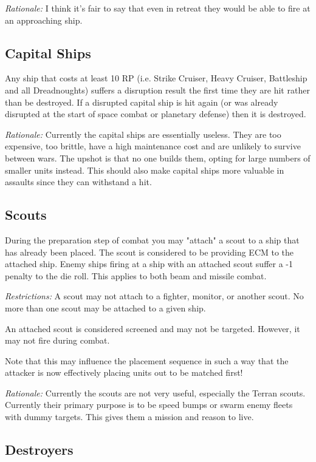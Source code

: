 \textit{Rationale:} I think it's fair to say that even in retreat they would be able to fire at an approaching ship.

\subsection{Capital Ships}

Any ship that costs at least 10 RP (i.e. Strike Cruiser, Heavy Cruiser, Battleship and all Dreadnoughts) suffers a disruption result the first time they are hit rather than be destroyed. If a disrupted capital ship is hit again (or was already disrupted at the start of space combat or planetary defense) then it is destroyed.

\textit{Rationale:} Currently the capital ships are essentially useless. They are too expensive, too brittle, have a high maintenance cost and are unlikely to survive between wars. The upshot is that no one builds them, opting for large numbers of smaller units instead. This should also make capital ships more valuable in assaults since they can withstand a hit.

\subsection{Scouts}

During the preparation step of combat you may "attach" a scout to a ship that has already been placed. The scout is considered to be providing ECM to the attached ship. Enemy ships firing at a ship with an attached scout suffer a -1 penalty to the die roll. This applies to both beam and missile combat.

\textit{Restrictions:} A scout may not attach to a fighter, monitor, or another scout. No more than one scout may be attached to a given ship.

An attached scout is considered screened and may not be targeted. However, it may not fire during combat.

Note that this may influence the placement sequence in such a way that the attacker is now effectively placing units out to be matched first!

\textit{Rationale:} Currently the scouts are not very useful, especially the Terran scouts. Currently their primary purpose is to be speed bumps or swarm enemy fleets with dummy targets. This gives them a mission and reason to live.

\subsection{Destroyers}

